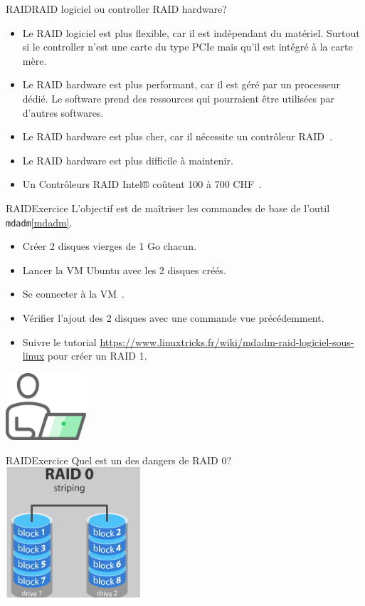 \documentclass{beamer}
\begin{document}
    \begin{frame}{RAID}{RAID logiciel ou controller RAID hardware?}
        \begin{itemize}
            \item Le RAID logiciel est plus flexible, car il est indépendant du matériel.
            Surtout si le controller n'est une carte du type PCIe mais qu'il est intégré à la carte mère.
            \item Le RAID hardware est plus performant, car il est géré par un processeur dédié.
            Le software prend des ressources qui pourraient être utilisées par d'autres softwares.
            \item Le RAID hardware est plus cher, car il nécessite un contrôleur RAID~.
            \item Le RAID hardware est plus difficile à maintenir.
            \item Un Contrôleurs RAID Intel® coûtent 100 à 700 CHF~.
        \end{itemize}
    \end{frame}

    \begin{frame}{RAID}{Exercice \execcounterdispinc{}}
        L'objectif est de maîtriser les commandes de base de l'outil \lstinline{mdadm}\cref{mdadm}.
        \begin{itemize}
            \item Créer 2 disques vierges de 1 Go chacun.
            \item Lancer la VM Ubuntu avec les 2 disques créés.
            \item Se connecter à la VM~.
            \item Vérifier l'ajout des 2 disques avec une commande vue précédemment.
            \item Suivre le tutorial \url{https://www.linuxtricks.fr/wiki/mdadm-raid-logiciel-sous-linux} pour créer un RAID 1.
        \end{itemize}
        \bigbreak
        \centering
        \includegraphics[width=3cm]{image/guy-in-front-of-desktop}
    \end{frame}

    \begin{frame}{RAID}{Exercice \execcounterdispinc{}}
        Quel est un des dangers de RAID 0?
        \bigbreak
        \centering
        \includegraphics[width=5cm]{image/raid-0}
    \end{frame}
\end{document}
